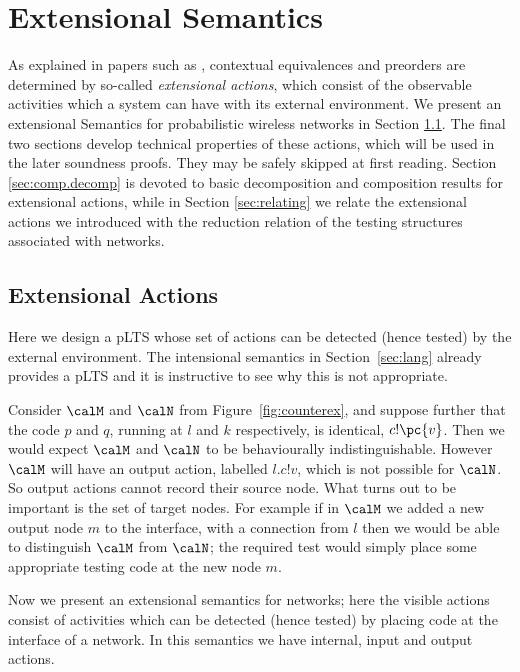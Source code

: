 \documentclass{LMCS}
\begin{document}
\section{Extensional Semantics}
\label{sec:ext.sem}
As explained in papers such as \cite{RS08-dbtm,dpibook}, contextual
equivalences and preorders are determined by so-called \emph{extensional actions},
which consist of the observable activities which a system can
have with its external environment. 
We present an extensional Semantics for probabilistic 
wireless networks in Section \ref{sec:ext.act}. 
The final two sections develop technical properties of these actions,
which will be used in the later soundness proofs. They may be safely skipped
at first reading. 
Section \ref{sec:comp.decomp} is devoted to 
basic decomposition and composition results for 
extensional actions, while in 
Section \ref{sec:relating} we relate 
the extensional actions we introduced 
with the reduction relation of 
the testing structures associated with 
networks.

\subsection{Extensional Actions}
\label{sec:ext.act}

Here we design a pLTS whose set of actions can be detected 
(hence tested) by the external environment. 
The intensional semantics in Section~\ref{sec:lang}
already provides a pLTS and it is instructive to see why this is not
appropriate.

Consider $\calM$ and $\calN$ from
Figure~\ref{fig:counterex}, and suppose further that the code $p$ and
$q$, running at $l$ and $k$ respectively, is identical,
  $c!\pc{v}$.  Then we would expect $\calM$ and
  $\calN$ to be behaviourally indistinguishable.  However 
$\calM$ will have an output action, labelled $l.c!v$, which is
not possible for $\calN$.  So output actions cannot record
their source node. What  turns out to be important is the set of target
nodes.  For example if in $\calM$ we added a new output node $m$ to
the interface, with a connection from $l$ then we would be able to
distinguish $\calM$ from $\calN$; the required test
would simply place some appropriate testing code at the new node $m$.

Now we present an extensional semantics for networks; here the
visible actions consist of activities which can be detected (hence
tested) by placing code at the interface of a network. In this
semantics we have internal, input and output actions.
\end{document}
